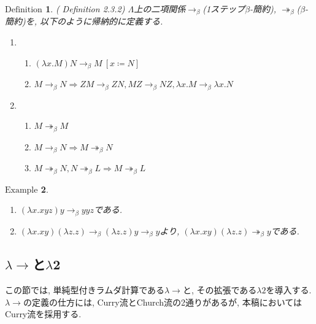 \documentclass[11pt]{jsreport}
\theoremstyle{mystyle}
\newtheorem{df}{$\textrm{Definition}$}[subsection]
\newtheorem{ex}[df]{$\textrm{Example}$}
\newcommand{\Lra}{\Longrightarrow}
\newcommand{\thra}{\twoheadrightarrow}
\newcommand{\lama}{\lambda \! \! \to}
\newcommand{\0}{\textbf{0}}
\newcommand{\1}{\textbf{1}}
\newcommand{\2}{\textbf{2}}
\begin{document}
\begin{shadebox}
  \begin{df}{(\cite{Bar} Definition 2.3.2)}
    $\Lambda$上の二項関係$\to_{\beta}$(1ステップ$\beta$-簡約), 
    $\thra_{\beta}$($\beta$-簡約)を, 
    以下のように帰納的に定義する. 
    \begin{enumerate}
      \item \begin{enumerate}
        \item $(\lambda x .M)N \to_{\beta} M\ [x \coloneqq N]$
        \item $M \to_{\beta} N \Lra ZM \to_{\beta} ZN, MZ \to_{\beta} NZ,
                 \lambda x .M \to_{\beta} \lambda x .N$
               \end{enumerate}
      \item \begin{enumerate}
        \item $M \thra_{\beta} M$
        \item $M \to_{\beta} N \Lra M \thra_{\beta} N$
        \item $M \thra_{\beta} N, N \thra_{\beta} L \Lra M \thra_{\beta} L$
               \end{enumerate}
    \end{enumerate}
  \end{df}
\end{shadebox}
\begin{ex}
  \begin{enumerate}
    \item $(\lambda x . xyz)y \to_{\beta} yyz$である. 
    \item $(\lambda x . xy)(\lambda z . z) \to_{\beta} (\lambda z . z) y \to_{\beta} y$より, 
             $(\lambda x . xy)(\lambda z . z) \thra_{\beta} y$である. 
  \end{enumerate}
\end{ex}
\subsection{$\lama$と$\lambda$2}
この節では, 単純型付きラムダ計算である$\lama$と, その拡張である$\lambda 2$を導入する. $\lama$の定義の仕方には, Curry流とChurch流の2通りがあるが, 本稿においてはCurry流を採用する. 
\end{document}
